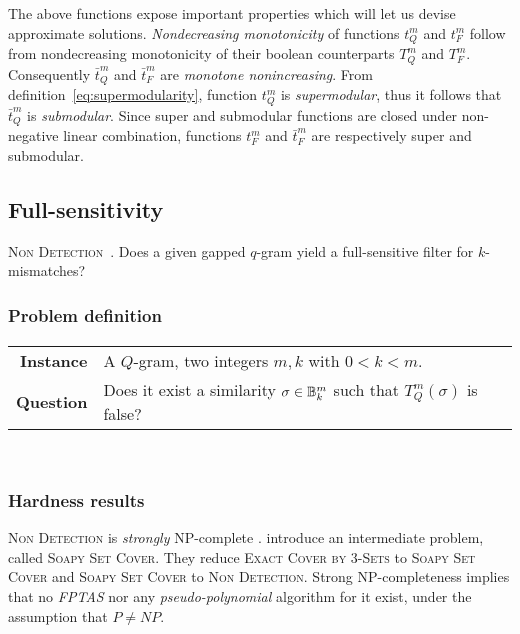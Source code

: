The above functions expose important properties which will let us devise approximate solutions.
\emph{Nondecreasing monotonicity} of functions $t_{Q}^{m}$ and $t_{F}^{m}$ follow from nondecreasing monotonicity of their boolean counterparts $T_{Q}^{m}$ and $T_{F}^{m}$. Consequently $\bar{t}_{Q}^{m}$ and $\bar{t}_{F}^{m}$ are \emph{monotone nonincreasing}.
From definition~\ref{eq:supermodularity}, function $t_{Q}^{m}$ is \emph{supermodular}, thus it follows that $\bar{t}_{Q}^{m}$ is \emph{submodular}.
Since super and submodular functions are closed under non-negative linear combination, functions $t_{F}^{m}$ and $\bar{t}_{F}^{m}$ are respectively super and submodular.

\subsection{Full-sensitivity}

\textsc{Non Detection}~\citep{Nicolas2005}. Does a given gapped $q$-gram yield a full-sensitive filter for $k$-mismatches?

\subsubsection{Problem definition}

\paragraph{}
\begin{tabular}{rl}
{\bf Instance}	&	A $Q$-gram, two integers $m,k$ with $0 < k < m$. \\
{\bf Question}	&	Does it exist a similarity $\sigma \in \mathbb {B}^{m}_{k}$ such that $T_{Q}^{m}(\sigma)$ is false? \\
\end{tabular}
\\

\subsubsection{Hardness results}

\textsc{Non Detection} is \emph{strongly} NP-complete \citep{Nicolas2005}.
\citeauthor{Nicolas2005} introduce an intermediate problem, called \textsc{Soapy Set Cover}. They reduce \textsc{Exact Cover by 3-Sets} to \textsc{Soapy Set Cover} and \textsc{Soapy Set Cover} to \textsc{Non Detection}.
Strong NP-completeness implies that no \emph{FPTAS} nor any \emph{pseudo-polynomial} algorithm for it exist, under the assumption that $P \neq NP$.

